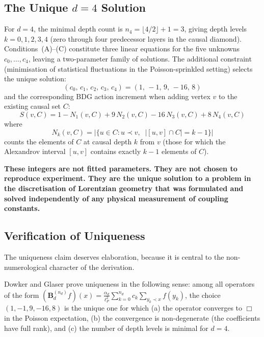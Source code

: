 \documentclass[12pt,a4paper]{article}
\begin{document}
\subsection{The Unique $d=4$ Solution}

For $d=4$, the minimal depth count is $n_4 = \lfloor 4/2\rfloor + 1 = 3$, giving depth levels $k=0,1,2,3,4$ (zero through four predecessor layers in the causal diamond).  Conditions~(A)--(C) constitute three linear equations for the five unknowns $c_0,\ldots,c_4$, leaving a two-parameter family of solutions.  The additional constraint (minimisation of statistical fluctuations in the Poisson-sprinkled setting) selects the unique solution:
\begin{equation}
  \boxed{(c_0,\,c_1,\,c_2,\,c_3,\,c_4) = (1,\,-1,\,9,\,-16,\,8)}
  \label{eq:BDGcoeffs}
\end{equation}
and the corresponding BDG action increment when adding vertex $v$ to the existing causal set $C$:
\begin{equation}
  S(v,C) = 1 - N_1(v,C) + 9\,N_2(v,C) - 16\,N_3(v,C) + 8\,N_4(v,C)
  \label{eq:S}
\end{equation}
where
\begin{equation}
  N_k(v,C) = \bigl|\{u\in C : u\prec v,\;\;|[u,v]\cap C|=k-1\}\bigr|
\end{equation}
counts the elements of $C$ at causal depth $k$ from $v$ (those for which the Alexandrov interval $[u,v]$ contains exactly $k-1$ elements of $C$).

\textbf{These integers are not fitted parameters.  They are not chosen to reproduce experiment.  They are the unique solution to a problem in the discretisation of Lorentzian geometry that was formulated and solved independently of any physical measurement of coupling constants.}

\subsection{Verification of Uniqueness}

The uniqueness claim deserves elaboration, because it is central to the non-numerological character of the derivation.

Dowker and Glaser \cite{Dowker2013} prove uniqueness in the following sense: among all operators of the form $(\mathbf{B}_d^{(n_d)} f)(x) = \frac{\alpha_d}{\ell_P^2}\sum_{k=0}^{n_d} c_k \sum_{y_k\prec x}f(y_k)$, the choice $(1,-1,9,-16,8)$ is the unique one for which (a) the operator converges to $\Box$ in the Poisson expectation, (b) the convergence is non-degenerate (the coefficients have full rank), and (c) the number of depth levels is minimal for $d=4$.
\end{document}
